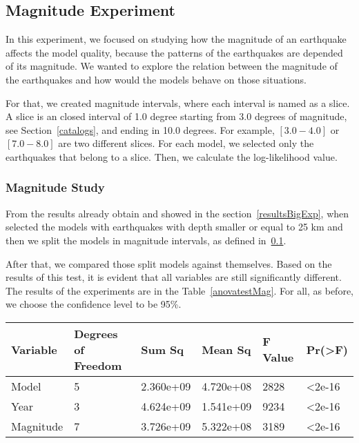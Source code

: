 \subsection{Magnitude Experiment}\label{magExp}

In this experiment, we focused on studying how the magnitude of an earthquake affects the model quality, because the patterns of the earthquakes are depended of its magnitude. We wanted to explore the relation between the magnitude of the earthquakes and how would the models behave on those situations.

For that, we created magnitude intervals, where each interval is named as a slice. A slice is an closed interval of 1.0 degree  starting from 3.0 degrees of magnitude, see Section~\ref{catalogs}, and ending in 10.0 degrees. For example, $[3.0-4.0]$ or $[7.0-8.0]$ are two different slices. For each model, we selected only the earthquakes that belong to a slice. Then, we calculate the log-likelihood value.
\subsubsection{Magnitude Study}
From the results already obtain and showed in the section~\ref{resultsBigExp}, when selected the models with earthquakes with depth smaller or equal to 25 km and then we split the models in magnitude intervals, as defined in~\ref{magExp}.

After that, we compared those split models against themselves. Based on the results of this test, it is evident that all variables are still significantly different. The results of the experiments are in the Table~\ref{anovatestMag}. For all, as before, we choose the confidence level to be 95\%.


\begin{table*}[!ht]
	\centering
	\begin{tabular}{|l|l|l|l|l|l|}
		\hline
		{Variable} & {Degrees of Freedom} & {Sum Sq}    & {Mean Sq}   & {F Value} & {Pr(\textgreater F)} \\
		\hline
		Model       & 5            	  & 2.360e+09      & 4.720e+08     & 2828     & \textless2e-16     \\
		\hline
		Year        & 3                  & 4.624e+09   & 1.541e+09    & 9234     & \textless2e-16     \\
		\hline
		Magnitude   & 7                  & 3.726e+09   & 5.322e+08    & 3189     & \textless2e-16	\\    
		\hline
	\end{tabular}
	\caption{ANOVA Test Results Values - Magnitude Study.}
	\label{anovatestMag}
\end{table*}

